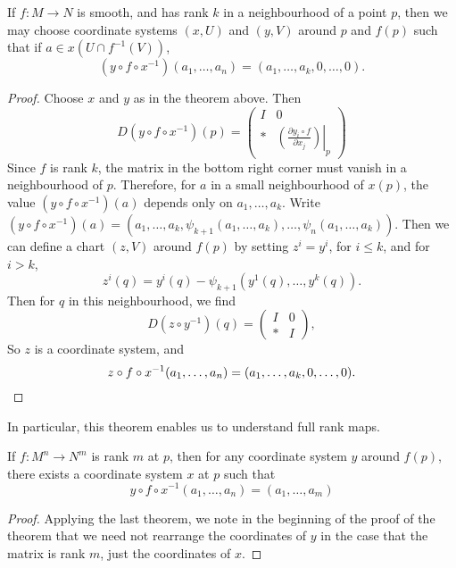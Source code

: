 \begin{corollary}
    If $f: M \to N$ is smooth, and has rank $k$ in a neighbourhood of a point $p$, then we may choose coordinate systems $(x,U)$ and $(y,V)$ around $p$ and $f(p)$ such that if $a \in x(U \cap f^{-1}(V))$,
    \[ (y \circ f \circ x^{-1})(a_1, \dots, a_n) = (a_1, \dots, a_k, 0, \dots, 0). \]
\end{corollary}
\begin{proof}
    Choose $x$ and $y$ as in the theorem above. Then
    \[ D(y \circ f \circ x^{-1})(p) = \begin{pmatrix} I & 0 \\ * & \left.\left( \frac{\partial y_i \circ f}{\partial x_j} \right)\right|_p \end{pmatrix} \]
    Since $f$ is rank $k$, the matrix in the bottom right corner must vanish in a neighbourhood of $p$. Therefore, for $a$ in a small neighbourhood of $x(p)$, the value $(y \circ f \circ x^{-1})(a)$ depends only on $a_1, \dots, a_k$. Write $(y \circ f \circ x^{-1})(a) = (a_1,\dots,a_k,\psi_{k+1}(a_1,\dots,a_k), \dots, \psi_n(a_1,\dots,a_k))$. Then we can define a chart $(z,V)$ around $f(p)$ by setting $z^i = y^i$, for $i \leq k$, and for $i > k$,
    \[ z^i(q) = y^i(q) - \psi_{k+1}(y^1(q), \dots, y^k(q)). \]
    Then for $q$ in this neighbourhood, we find
    \[ D(z \circ y^{-1})(q) = \begin{pmatrix} I & 0 \\ * & I \end{pmatrix}, \]
    So $z$ is a coordinate system, and
    \[ z \circ f \circ x^{-1}(a_1, \dots, a_n) = (a_1, \dots, a_k, 0, \dots, 0). \qedhere \]
\end{proof}

In particular, this theorem enables us to understand full rank maps.

\begin{corollary}
    If $f: M^n \to N^m$ is rank $m$ at $p$, then for any coordinate system $y$ around $f(p)$, there exists a coordinate system $x$ at $p$ such that
    \[ y \circ f \circ x^{-1} (a_1, \dots, a_n) = (a_1, \dots, a_m) \]
\end{corollary}
\begin{proof}
    Applying the last theorem, we note in the beginning of the proof of the theorem that we need not rearrange the coordinates of $y$ in the case that the matrix is rank $m$, just the coordinates of $x$.
\end{proof}

